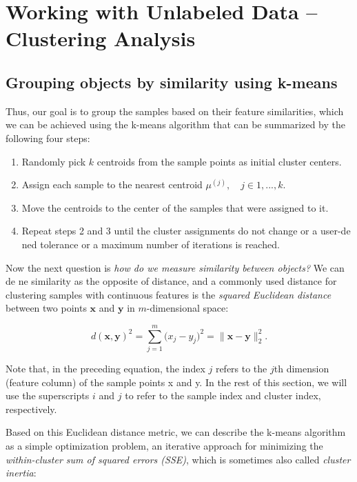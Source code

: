 \documentclass[letterpaper]{report}
\begin{document}

\chapter{Working with Unlabeled Data -- Clustering Analysis}


\section{Grouping objects by similarity using k-means}

Thus, our goal is to group the samples based on their feature similarities, which we can be achieved using the k-means algorithm that can be summarized by the following four steps:

\begin{enumerate}
\item Randomly pick $k$ centroids from the sample points as initial cluster centers.
\item Assign each sample to the nearest centroid $\mu^{(j)}, \quad j \in {1, ..., k}.$
\item Move the centroids to the center of the samples that were assigned to it.
\item Repeat steps 2 and 3 until the cluster assignments do not change or a user-de ned tolerance or a maximum number of iterations is reached.
\end{enumerate}

Now the next question is \textit{how do we measure similarity between objects?} We can de ne similarity as the opposite of distance, and a commonly used distance for clustering samples with continuous features is the \textit{squared Euclidean distance} between two points $\mathbf{x}$ and $\mathbf{y}$ in $m$-dimensional space:

\[
d(\mathbf{x}, \mathbf{y})^2 = \sum_{j=1}^{m} \big(x_j - y_j \big)^2 = \lVert \mathbf{x} - \mathbf{y} \rVert^{2}_{2}.
\]

Note that, in the preceding equation, the index $j$ refers to the $j$th dimension
(feature column) of the sample points x and y. In the rest of this section, we will use the superscripts $i$ and $j$ to refer to the sample index and cluster index, respectively.


Based on this Euclidean distance metric, we can describe the k-means algorithm
as a simple optimization problem, an iterative approach for minimizing the \textit{within-cluster sum of squared errors (SSE)}, which is sometimes also called \textit{cluster inertia}:
\end{document}
